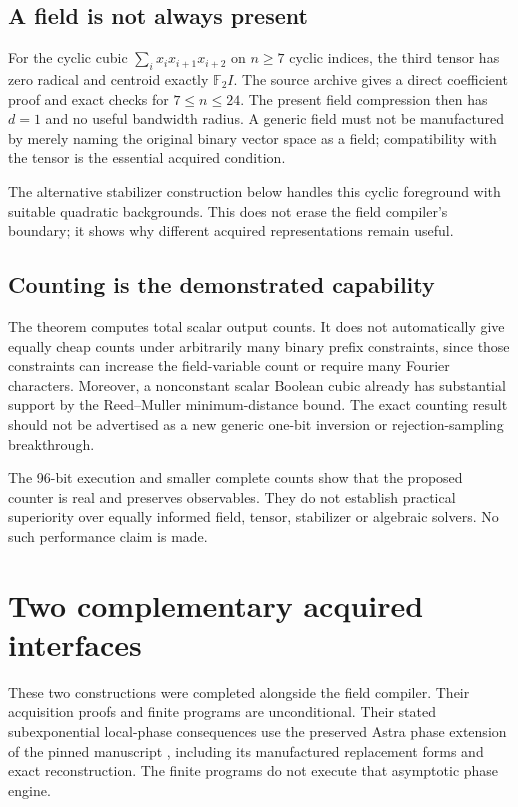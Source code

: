 \documentclass[11pt]{article}
\theoremstyle{remark}\newtheorem{remark}[theorem]{Remark}
\newcommand{\F}{\mathbb F}
\begin{document}
\subsection{A field is not always present}
For the cyclic cubic $\sum_i x_ix_{i+1}x_{i+2}$ on $n\ge7$ cyclic indices, the third tensor has zero radical and centroid exactly $\F_2 I$. The source archive gives a direct coefficient proof and exact checks for $7\le n\le24$. The present field compression then has $d=1$ and no useful bandwidth radius. A generic field must not be manufactured by merely naming the original binary vector space as a field; compatibility with the tensor is the essential acquired condition.

The alternative stabilizer construction below handles this cyclic foreground with suitable quadratic backgrounds. This does not erase the field compiler's boundary; it shows why different acquired representations remain useful.

\subsection{Counting is the demonstrated capability}
The theorem computes total scalar output counts. It does not automatically give equally cheap counts under arbitrarily many binary prefix constraints, since those constraints can increase the field-variable count or require many Fourier characters. Moreover, a nonconstant scalar Boolean cubic already has substantial support by the Reed--Muller minimum-distance bound. The exact counting result should not be advertised as a new generic one-bit inversion or rejection-sampling breakthrough.

The 96-bit execution and smaller complete counts show that the proposed counter is real and preserves observables. They do not establish practical superiority over equally informed field, tensor, stabilizer or algebraic solvers. No such performance claim is made.

\section{Two complementary acquired interfaces}\label{sec:other}
These two constructions were completed alongside the field compiler. Their acquisition proofs and finite programs are unconditional. Their stated subexponential local-phase consequences use the preserved Astra phase extension of the pinned manuscript \cite{eth}, including its manufactured replacement forms and exact reconstruction. The finite programs do not execute that asymptotic phase engine.
\end{document}
